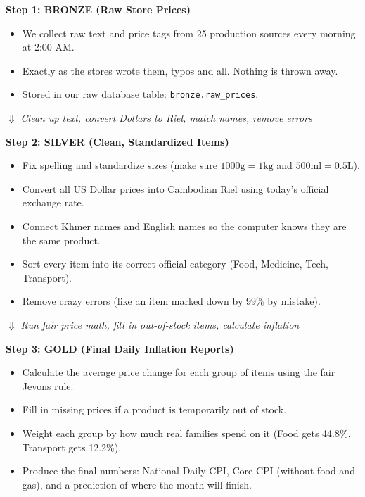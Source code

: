 \documentclass[11pt,a4paper,oneside]{article}
\begin{document}
\begin{center}
\begin{tcolorbox}[colback=white,colframe=NavyBlue,width=0.95\textwidth,title=\bfseries The 3 Steps: Raw Data to Final Numbers]
\small
\textbf{Step 1: BRONZE (Raw Store Prices)}
\begin{itemize}[noitemsep]
    \item We collect raw text and price tags from 25 production sources every morning at 2:00 AM.
    \item Exactly as the stores wrote them, typos and all. Nothing is thrown away.
    \item Stored in our raw database table: \texttt{bronze.raw\_prices}.
\end{itemize}

\centering $\Downarrow$ \textit{Clean up text, convert Dollars to Riel, match names, remove errors} \\
\raggedright

\textbf{Step 2: SILVER (Clean, Standardized Items)}
\begin{itemize}[noitemsep]
    \item Fix spelling and standardize sizes (make sure $1000\text{g} = 1\text{kg}$ and $500\text{ml} = 0.5\text{L}$).
    \item Convert all US Dollar prices into Cambodian Riel using today's official exchange rate.
    \item Connect Khmer names and English names so the computer knows they are the same product.
    \item Sort every item into its correct official category (Food, Medicine, Tech, Transport).
    \item Remove crazy errors (like an item marked down by 99\% by mistake).
\end{itemize}

\centering $\Downarrow$ \textit{Run fair price math, fill in out-of-stock items, calculate inflation} \\
\raggedright

\textbf{Step 3: GOLD (Final Daily Inflation Reports)}
\begin{itemize}[noitemsep]
    \item Calculate the average price change for each group of items using the fair Jevons rule.
    \item Fill in missing prices if a product is temporarily out of stock.
    \item Weight each group by how much real families spend on it (Food gets 44.8\%, Transport gets 12.2\%).
    \item Produce the final numbers: National Daily CPI, Core CPI (without food and gas), and a prediction of where the month will finish.
\end{itemize}
\end{tcolorbox}
\end{center}
\end{document}
